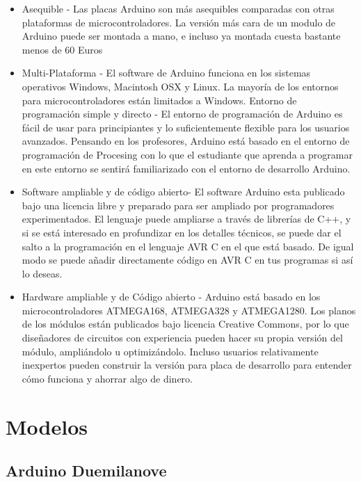 \documentclass[12pt,a4paper]{report}
\begin{document}
\begin{itemize} 
	 \item Asequible - Las placas Arduino son más asequibles comparadas con otras plataformas de microcontroladores. La versión más cara de un modulo de Arduino puede ser montada a mano, e incluso ya montada cuesta bastante menos de 60 Euros
	 
	 \item Multi-Plataforma - El software de Arduino funciona en los sistemas operativos Windows, Macintosh OSX y Linux. La mayoría de los entornos para microcontroladores están limitados a Windows.
Entorno de programación simple y directo - El entorno de programación de Arduino es fácil de usar para principiantes y lo suficientemente flexible para los usuarios avanzados. Pensando en los profesores, Arduino está basado en el entorno de programación de Procesing con lo que el estudiante que aprenda a programar en este entorno se sentirá familiarizado con el entorno de desarrollo Arduino.

	\item Software ampliable y de código abierto- El software Arduino esta publicado bajo una licencia libre y preparado para ser ampliado por programadores experimentados. El lenguaje puede ampliarse a través de librerías de C++, y si se está interesado en profundizar en los detalles técnicos, se puede dar el salto a la programación en el lenguaje AVR C en el que está basado. De igual modo se puede añadir directamente código en AVR C en tus programas si así lo deseas.
	
	\item Hardware ampliable y de Código abierto - Arduino está basado en los microcontroladores ATMEGA168, ATMEGA328 y ATMEGA1280. Los planos de los módulos están publicados bajo licencia Creative Commons, por lo que diseñadores de circuitos con experiencia pueden hacer su propia versión del módulo, ampliándolo u optimizándolo. Incluso usuarios relativamente inexpertos pueden construir la versión para placa de desarrollo para entender cómo funciona y ahorrar algo de dinero.
\end{itemize}
\section{Modelos}
\subsection{Arduino Duemilanove}
\end{document}

